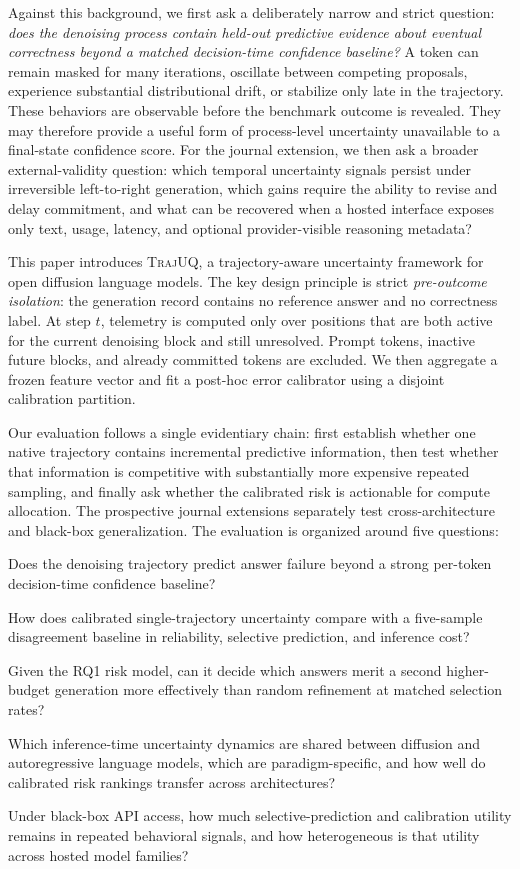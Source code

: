 \documentclass[10pt]{article}
\newcommand{\method}{\textsc{TrajUQ}\xspace}
\begin{document}
Against this background, we first ask a deliberately narrow and strict question: \emph{does the denoising process contain held-out predictive evidence about eventual correctness beyond a matched decision-time confidence baseline?}
A token can remain masked for many iterations, oscillate between competing proposals, experience substantial distributional drift, or stabilize only late in the trajectory.
These behaviors are observable before the benchmark outcome is revealed.
They may therefore provide a useful form of process-level uncertainty unavailable to a final-state confidence score. For the journal extension, we then ask a broader external-validity question: which temporal uncertainty signals persist under irreversible left-to-right generation, which gains require the ability to revise and delay commitment, and what can be recovered when a hosted interface exposes only text, usage, latency, and optional provider-visible reasoning metadata?

This paper introduces \method, a trajectory-aware uncertainty framework for open diffusion language models.
The key design principle is strict \emph{pre-outcome isolation}: the generation record contains no reference answer and no correctness label.
At step $t$, telemetry is computed only over positions that are both active for the current denoising block and still unresolved.
Prompt tokens, inactive future blocks, and already committed tokens are excluded.
We then aggregate a frozen feature vector and fit a post-hoc error calibrator using a disjoint calibration partition.

Our evaluation follows a single evidentiary chain: first establish whether one
native trajectory contains incremental predictive information, then test
whether that information is competitive with substantially more expensive
repeated sampling, and finally ask whether the calibrated risk is actionable
for compute allocation. The prospective journal extensions separately test
cross-architecture and black-box generalization. The evaluation is organized
around five questions:
\begin{description}[leftmargin=0.8cm,labelwidth=0.65cm]
\item[RQ1:] Does the denoising trajectory predict answer failure beyond a strong per-token decision-time confidence baseline?
\item[RQ2:] How does calibrated single-trajectory uncertainty compare with a five-sample disagreement baseline in reliability, selective prediction, and inference cost?
\item[RQ3:] Given the RQ1 risk model, can it decide which answers merit a second higher-budget generation more effectively than random refinement at matched selection rates?
\item[RQ4:] Which inference-time uncertainty dynamics are shared between diffusion and autoregressive language models, which are paradigm-specific, and how well do calibrated risk rankings transfer across architectures?
\item[RQ5:] Under black-box API access, how much selective-prediction and calibration utility remains in repeated behavioral signals, and how heterogeneous is that utility across hosted model families?
\end{description}
\end{document}
